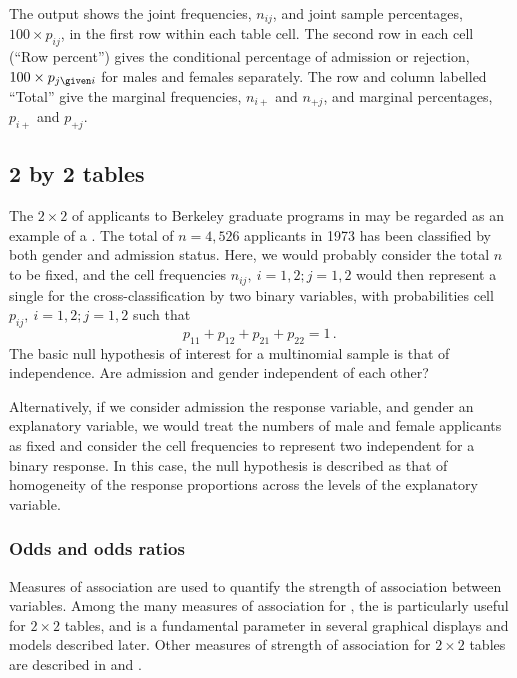 \documentclass[11pt]{book}\usepackage[]{graphicx}\usepackage[]{color}
\begin{document}
The output shows the joint frequencies, $n_{ij}$, and joint sample percentages,
$100 \times p_{ij}$, in the first row within each table cell.
The second row in each cell (``Row percent'')
gives the conditional percentage of admission or rejection,
$100 \times p_{j\given i}$ for males and females separately.
The row and column labelled ``Total'' give the
marginal frequencies, $n_{i+}$ and $n_{+j}$,
and marginal percentages, $p_{i+}$ and $p_{+j}$.



\subsection{2 by 2 tables}\label{sec:twoway-twobytwo}

The $2 \times 2$ \ctab of applicants to Berkeley graduate programs in  may be regarded as an example of a
.
The total of $n = 4,526$ applicants in 1973 has been classified by both
gender and admission status.
Here, we would probably consider the total $n$ to be fixed,
and the cell frequencies $n_{ij},  \: i=1,2; j=1,2$
would then represent a single
 for the cross-classification by two
binary variables,
with probabilities cell $p_{ij},  \: i=1,2; j=1,2$
such that
\begin{equation*}
 p_{11} + p_{12} + p_{21} + p_{22} = 1
 \period
\end{equation*}
The basic null hypothesis of interest for a multinomial sample is that
of independence.  Are admission and gender independent of each other?

Alternatively, if we consider admission the response variable, and
gender an explanatory variable, we would treat the numbers of male
and female applicants as fixed
and consider the cell frequencies to represent two independent
 for a binary response.
In this case, the null hypothesis is described as that of homogeneity
of the response proportions across the levels of the explanatory variable.

\subsubsection{Odds and odds ratios}\label{sec:twoway-odds}
Measures of association are used to quantify the strength of association
between variables.  Among the many measures of association for
\ctabs, the  is particularly useful for
$2 \times 2$ tables, and is a fundamental parameter in several
graphical displays and models described later.
Other measures of strength of association for $2 \times 2$ tables
are described in \citet[]{Stokes-etal:00} and \citet[\S 2.2]{Agresti:96}.
\end{document}
